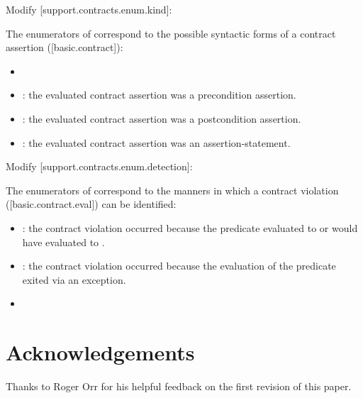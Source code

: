 Modify [support.contracts.enum.kind]:

\begin{adjustwidth}{0.5cm}{0.5cm}
The enumerators of  correspond to the possible syntactic forms of a contract assertion ([basic.contract]):
\begin{itemize}
\item {}
\item {}: the evaluated contract assertion was a precondition assertion.
\item {}: the evaluated contract assertion was a postcondition assertion.
\item {}: the evaluated contract assertion was an assertion-statement.
\end{itemize}
\end{adjustwidth}

Modify [support.contracts.enum.detection]:

\begin{adjustwidth}{0.5cm}{0.5cm}
The enumerators of  correspond to the manners in which a contract violation ([basic.contract.eval]) can be identified:
\begin{itemize}
\item {}: the contract violation occurred because the predicate evaluated to  or would have evaluated to .
\item {}: the contract violation occurred because the evaluation of the predicate exited via an exception.
\item {}
\end{itemize}
\end{adjustwidth}


\section*{Acknowledgements}
Thanks to Roger Orr for his helpful feedback on the first revision of this paper.

